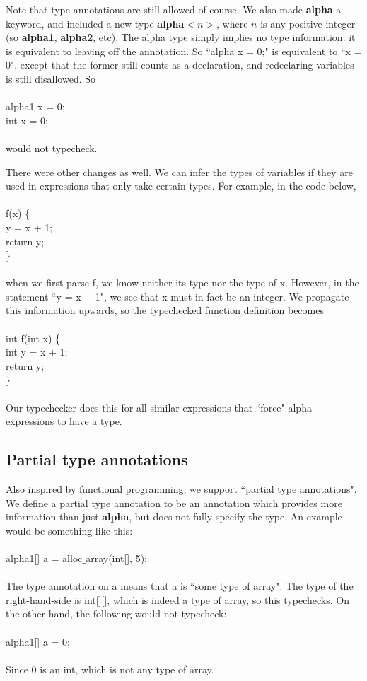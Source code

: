 \documentclass{article}
\begin{document}
Note that type annotations are still allowed of course. We also made \textbf{alpha} a keyword, and included a new type \textbf{alpha}$<n>$, where $n$ is any positive integer (so \textbf{alpha1}, \textbf{alpha2}, etc). The alpha type simply implies no type information: it is equivalent to leaving off the annotation. So ``alpha x = 0;" is equivalent to ``x = 0", except that the former still counts as a declaration, and redeclaring variables is still disallowed. So\\
\\
alpha1 x = 0;\\
int x = 0;\\
\\
would not typecheck.

There were other changes as well. We can infer the types of variables if they are used in expressions that only take certain types. For example, in the code below,\\
\\
f(x) \{ \\
  y = x + 1; \\
  return y; \\
\} \\
\\
when we first parse f, we know neither its type nor the type of x. However, in the statement ``y = x + 1", we see that x must in fact be an integer. We propagate this information upwards, so the typechecked function definition becomes\\
\\
int f(int x) \{ \\
  int y = x + 1; \\
  return y; \\
\} \\
\\
Our typechecker does this for all similar expressions that ``force" alpha expressions to have a type.

\subsection{Partial type annotations}
Also inspired by functional programming, we support ``partial type annotations". We define a partial type annotation to be an annotation which provides more information than just \textbf{alpha}, but does not fully specify the type. An example would be something like this:\\
\\
alpha1[] a = alloc$\_$array(int[], 5);\\
\\
The type annotation on a means that a is ``some type of array". The type of the right-hand-side is int[][], which is indeed a type of array, so this typechecks. On the other hand, the following would not typecheck:\\
\\
alpha1[] a = 0;\\
\\
Since 0 is an int, which is not any type of array.
\end{document}

